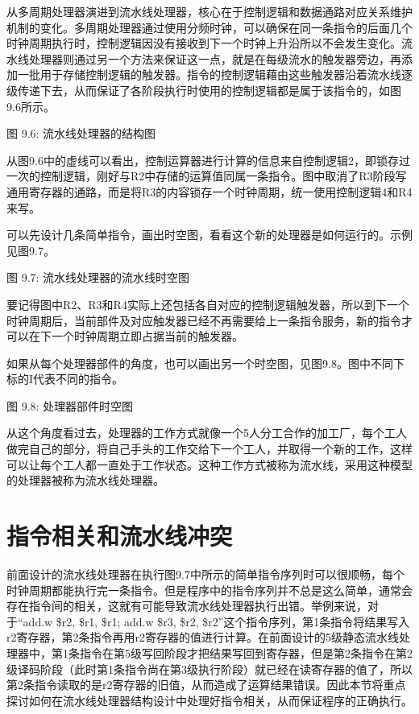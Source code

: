 \documentclass[]{ctexbook}
\begin{document}
从多周期处理器演进到流水线处理器，核心在于控制逻辑和数据通路对应关系维护机制的变化。多周期处理器通过使用分频时钟，可以确保在同一条指令的后面几个时钟周期执行时，控制逻辑因没有接收到下一个时钟上升沿所以不会发生变化。流水线处理器则通过另一个方法来保证这一点，就是在每级流水的触发器旁边，再添加一批用于存储控制逻辑的触发器。指令的控制逻辑藉由这些触发器沿着流水线逐级传递下去，从而保证了各阶段执行时使用的控制逻辑都是属于该指令的，如图9.6所示。

图 9.6: 流水线处理器的结构图

从图9.6中的虚线可以看出，控制运算器进行计算的信息来自控制逻辑2，即锁存过一次的控制逻辑，刚好与R2中存储的运算值同属一条指令。图中取消了R3阶段写通用寄存器的通路，而是将R3的内容锁存一个时钟周期，统一使用控制逻辑4和R4来写。

可以先设计几条简单指令，画出时空图，看看这个新的处理器是如何运行的。示例见图9.7。

图 9.7: 流水线处理器的流水线时空图

要记得图中R2、R3和R4实际上还包括各自对应的控制逻辑触发器，所以到下一个时钟周期后，当前部件及对应触发器已经不再需要给上一条指令服务，新的指令才可以在下一个时钟周期立即占据当前的触发器。

如果从每个处理器部件的角度，也可以画出另一个时空图，见图9.8。图中不同下标的I代表不同的指令。

图 9.8: 处理器部件时空图

从这个角度看过去，处理器的工作方式就像一个5人分工合作的加工厂，每个工人做完自己的部分，将自己手头的工作交给下一个工人，并取得一个新的工作，这样可以让每个工人都一直处于工作状态。这种工作方式被称为流水线，采用这种模型的处理器被称为流水线处理器。

\hypertarget{sec-hazard}{%
\section{指令相关和流水线冲突}\label{sec-hazard}}

前面设计的流水线处理器在执行图9.7中所示的简单指令序列时可以很顺畅，每个时钟周期都能执行完一条指令。但是程序中的指令序列并不总是这么简单，通常会存在指令间的相关，这就有可能导致流水线处理器执行出错。举例来说，对于``add.w \$r2, \$r1, \$r1; add.w \$r3, \$r2, \$r2''这个指令序列，第1条指令将结果写入r2寄存器，第2条指令再用r2寄存器的值进行计算。在前面设计的5级静态流水线处理器中，第1条指令在第5级写回阶段才把结果写回到寄存器，但是第2条指令在第2级译码阶段（此时第1条指令尚在第3级执行阶段）就已经在读寄存器的值了，所以第2条指令读取的是r2寄存器的旧值，从而造成了运算结果错误。因此本节将重点探讨如何在流水线处理器结构设计中处理好指令相关，从而保证程序的正确执行。
\end{document}
